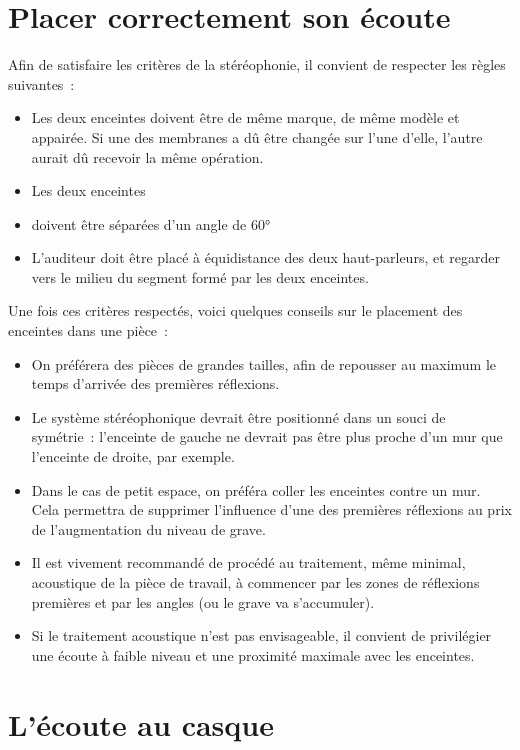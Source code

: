 \documentclass[
]{book}
\providecommand{\tightlist}{%
  \setlength{\itemsep}{0pt}\setlength{\parskip}{0pt}}
\begin{document}
\hypertarget{placer-correctement-son-uxe9coute}{%
\section{Placer correctement son écoute}\label{placer-correctement-son-uxe9coute}}

Afin de satisfaire les critères de la stéréophonie, il convient de respecter les règles suivantes~:

\begin{itemize}
\tightlist
\item
  Les deux enceintes doivent être de même marque, de même modèle et appairée. Si une des membranes a dû être changée sur l'une d'elle, l'autre aurait dû recevoir la même opération.
\item
  Les deux enceintes
\item
  doivent être séparées d'un angle de 60°
\item
  L'auditeur doit être placé à équidistance des deux haut-parleurs, et regarder vers le milieu du segment formé par les deux enceintes.
\end{itemize}

Une fois ces critères respectés, voici quelques conseils sur le placement des enceintes dans une pièce~:

\begin{itemize}
\tightlist
\item
  On préférera des pièces de grandes tailles, afin de repousser au maximum le temps d'arrivée des premières réflexions.
\item
  Le système stéréophonique devrait être positionné dans un souci de symétrie~: l'enceinte de gauche ne devrait pas être plus proche d'un mur que l'enceinte de droite, par exemple.
\item
  Dans le cas de petit espace, on préféra coller les enceintes contre un mur. Cela permettra de supprimer l'influence d'une des premières réflexions au prix de l'augmentation du niveau de grave.
\item
  Il est vivement recommandé de procédé au traitement, même minimal, acoustique de la pièce de travail, à commencer par les zones de réflexions premières et par les angles (ou le grave va s'accumuler).
\item
  Si le traitement acoustique n'est pas envisageable, il convient de privilégier une écoute à faible niveau et une proximité maximale avec les enceintes.
\end{itemize}

\hypertarget{luxe9coute-au-casque}{%
\section{L'écoute au casque}\label{luxe9coute-au-casque}}
\end{document}
